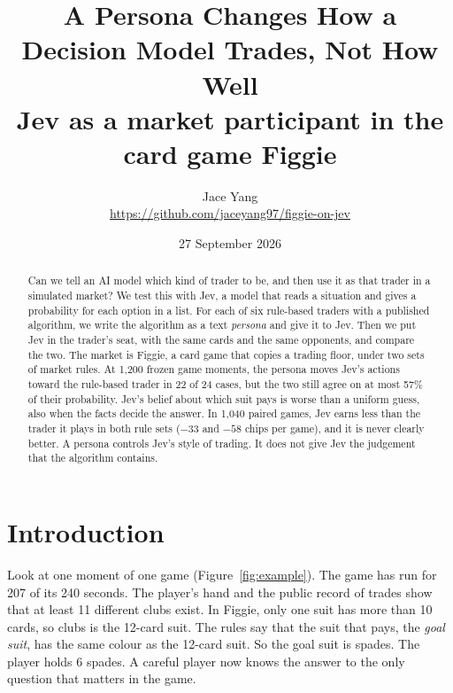 \documentclass[10pt]{article}
\title{A Persona Changes How a Decision Model Trades, Not How Well\\[3pt]
\large Jev as a market participant in the card game Figgie}
\author{Jace Yang\\\small\url{https://github.com/jaceyang97/figgie-on-jev}}
\date{27 September 2026}
\begin{document}
\maketitle

\begin{abstract}
\noindent
Can we tell an AI model which kind of trader to be, and then use it as that trader in a simulated market? We test this
with Jev, a model that reads a situation and gives a probability for each option in a list. For each of six rule-based
traders with a published algorithm, we write the algorithm as a text \emph{persona} and give it to Jev. Then we put Jev
in the trader's seat, with the same cards and the same opponents, and compare the two. The market is Figgie, a card
game that copies a trading floor, under two sets of market rules. At 1,200 frozen game moments, the persona moves
Jev's actions toward the rule-based trader in 22 of 24 cases, but the two still agree on at most 57\% of their
probability. Jev's belief about which suit pays is worse than a uniform guess, also when the facts decide the answer.
In 1,040 paired games, Jev earns less than the trader it plays in both rule sets ($-33$ and $-58$ chips per game), and
it is never clearly better. A persona controls Jev's style of trading. It does not give Jev the judgement that the
algorithm contains.
\end{abstract}

\section{Introduction}\label{sec:intro}

Look at one moment of one game (Figure~\ref{fig:example}). The game has run for 207 of its 240 seconds. The player's
hand and the public record of trades show that at least 11 different clubs exist. In Figgie, only one suit has more than 10 cards, so
clubs is the 12-card suit. The rules say that the suit that pays, the \emph{goal suit}, has the same colour as the
12-card suit. So the goal suit is spades. The player holds 6 spades. A careful player now knows the answer to the only
question that matters in the game.
\end{document}
